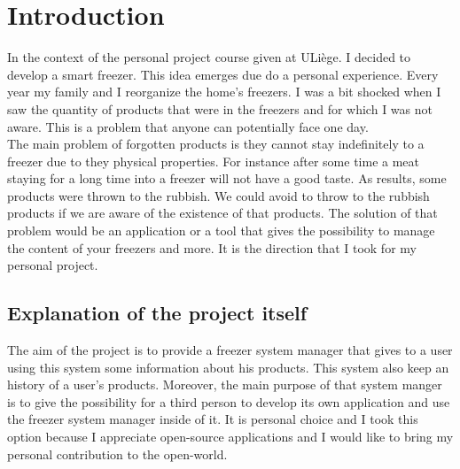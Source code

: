 \section{Introduction}
In the context of the personal project course given at ULiège. I decided to develop a smart freezer. This idea emerges due do a personal experience. Every year my family and I reorganize the home's freezers. I was a bit shocked when I saw the quantity of products that were in the freezers and for which I was not aware. This is a problem that anyone can potentially face one day. \\

The main problem of forgotten products is they cannot stay indefinitely to a freezer due to they physical properties. For instance after some time a meat staying for a long time into a freezer will not have a good taste. As results, some products were thrown to the rubbish. We could avoid to throw to the rubbish products if we are aware of the existence of that products. The solution of that problem would be an application or a tool that gives the possibility to manage the content of your freezers and more. It is the direction that I took for my personal project.

\subsection{Explanation of the project itself}
The aim of the project is to provide a freezer system manager that gives to a user using this system some information about his products. This system also keep an history of a user's products. Moreover, the main purpose of that system manger is to give the possibility for a third person to develop its own application and use the freezer system manager inside of it. It is personal choice and I took this option because I appreciate open-source applications and I would like to bring my personal contribution to the open-world. \\

